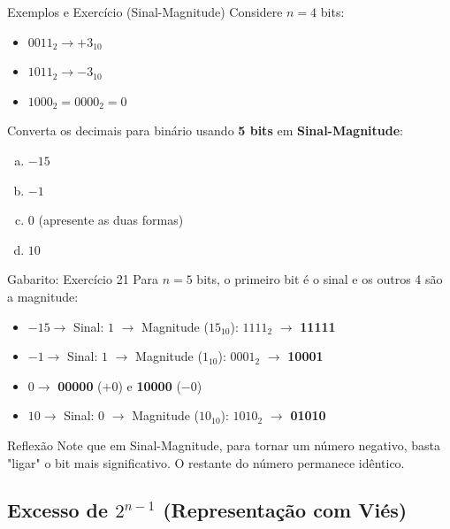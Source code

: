 \begin{frame}{Exemplos e Exercício (Sinal-Magnitude)}
    Considere $n=4$ bits:
    \begin{itemize}
        \item $0011_2 \rightarrow +3_{10}$
        \item $1011_2 \rightarrow -3_{10}$
        \item $1000_2 = 0000_2 = 0$
    \end{itemize}

    \vspace{0.4cm}

    Converta os decimais para binário usando \textbf{5 bits} em \textbf{Sinal-Magnitude}:
    \begin{enumerate}[a)]
        \item $-15$
        \item $-1$
        \item $0$ (apresente as duas formas)
        \item $10$
    \end{enumerate}

\end{frame}

\begin{frame}{Gabarito: Exercício 21}
    Para $n=5$ bits, o primeiro bit é o sinal e os outros 4 são a magnitude:

    \begin{itemize}
        \item[\textbf{a)}] $-15 \rightarrow$ Sinal: $1$ $\rightarrow$ Magnitude ($15_{10}$): $1111_2$ $\rightarrow$ \textbf{11111}
        \item[\textbf{b)}] $-1 \rightarrow$ Sinal: $1$ $\rightarrow$ Magnitude ($1_{10}$): $0001_2$ $\rightarrow$ \textbf{10001}
        \item[\textbf{c)}] $0 \rightarrow$ \textbf{00000} ($+0$) e \textbf{10000} ($-0$)
        \item[\textbf{d)}] $10 \rightarrow$ Sinal: $0$ $\rightarrow$ Magnitude ($10_{10}$): $1010_2$ $\rightarrow$ \textbf{01010}
    \end{itemize}

    \begin{block}{Reflexão}
        Note que em Sinal-Magnitude, para tornar um número negativo, basta "ligar" o bit mais significativo. O restante do número permanece idêntico.
    \end{block}
\end{frame}

\subsection{Excesso de $2^{n-1}$ (Representação com Viés)}

